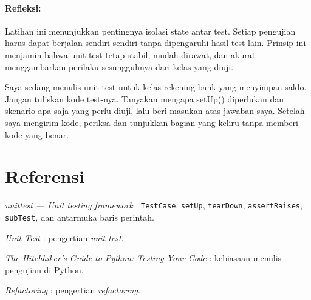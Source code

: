\paragraph{Refleksi:}
Latihan ini menunjukkan pentingnya isolasi state antar test.  
Setiap pengujian harus dapat berjalan sendiri-sendiri tanpa dipengaruhi hasil test lain.  
Prinsip ini menjamin bahwa unit test tetap stabil, mudah dirawat, dan akurat menggambarkan perilaku sesungguhnya dari kelas yang diuji.

\begin{promptterarah}
Saya sedang menulis unit test untuk kelas rekening bank yang menyimpan saldo. Jangan tuliskan kode test-nya. Tanyakan mengapa setUp() diperlukan dan skenario apa saja yang perlu diuji, lalu beri masukan atas jawaban saya. Setelah saya mengirim kode, periksa dan tunjukkan bagian yang keliru tanpa memberi kode yang benar.
\end{promptterarah}

\section*{Referensi}
\begin{daftarrapat}
  \item \textit{unittest — Unit testing framework} \cite{py-unittest}: \texttt{TestCase}, \texttt{setUp}, \texttt{tearDown}, \texttt{assertRaises}, \texttt{subTest}, dan antarmuka baris perintah.
  \item \textit{Unit Test} \cite{fowler-unit-test}: pengertian \textit{unit test}.
  \item \textit{The Hitchhiker's Guide to Python: Testing Your Code} \cite{hitchhiker-testing}: kebiasaan menulis pengujian di Python.
  \item \textit{Refactoring} \cite{fowler-refactoring}: pengertian \textit{refactoring}.
\end{daftarrapat}
